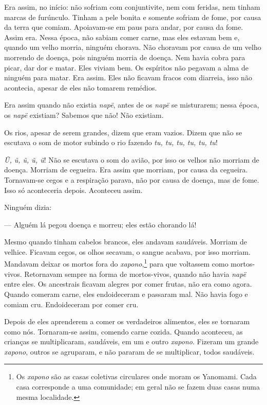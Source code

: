 Era assim, no início: não sofriam com conjuntivite, nem com feridas, nem
tinham marcas de furúnculo. Tinham a pele bonita e somente sofriam de
fome, por causa da terra que comiam. Apoiavam-se em paus para andar, por
causa da fome. Assim era. Nessa época, não sabiam comer carne, mas eles
estavam bem e, quando um velho morria, ninguém chorava. Não choravam por
causa de um velho morrendo de doença, pois ninguém morria de doença. Nem
havia cobra para picar, dar dor e matar. Eles viviam bem. Os espíritos
não pegavam a alma de ninguém para matar. Era assim. Eles não ficavam
fracos com diarreia, isso não acontecia, apesar de eles não tomarem
remédios. 

Era assim quando não existia \textit{napë}, antes de os \textit{napë} se
misturarem; nessa época, os \textit{napë} existiam? Sabemos que não! Não
existiam. 

Os rios, apesar de serem grandes, dizem que eram vazios. Dizem que não
se escutava o som de motor subindo o rio fazendo \textit{tu, tu, tu, tu, tu,
tu}!

\textit{Ũ, ũ, ũ, ũ, ũ}! Não se escutava o som do avião, por isso os velhos
não morriam de doença. Morriam de cegueira. Era assim que morriam, por
causa da cegueira. Tornavam-se cegos e a respiração parava, não por
causa de doença, mas de fome. Isso só aconteceria depois. Aconteceu
assim. 

Ninguém dizia:

--- Alguém lá pegou doença e morreu; eles estão chorando lá! 

Mesmo quando tinham cabelos brancos, eles andavam saudáveis. Morriam de
velhice. Ficavam cegos, os olhos secavam, o sangue acabava, por isso
morriam. Mandavam deixar os mortos fora do \textit{xapono},\footnote{Os \textit{xapono} são as 
casas coletivas circulares onde moram os Yanomami. Cada casa corresponde a 
uma comunidade; em geral não se fazem duas casas numa mesma localidade.} para que voltassem
como mortos-vivos. Retornavam sempre na forma de
mortos-vivos, quando não havia \textit{napë} entre eles. Os ancestrais
ficavam alegres por comer frutas, não era como agora. Quando comeram
carne, eles endoideceram e passaram mal. Não havia fogo e comiam cru.
Endoideceram por comer cru.

Depois de eles aprenderem a comer os verdadeiros alimentos, eles se
tornaram como nós. Tornaram-se assim, comendo carne cozida. Quando
aconteceu, as crianças se multiplicaram, saudáveis, em um e outro
\textit{xapono}. Fizeram um grande \textit{xapono}, outros se agruparam, e não
pararam de se multiplicar, todos saudáveis.

